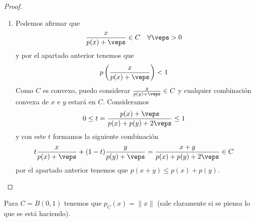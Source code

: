 \begin{propiedades}
\begin{proof}
\begin{enumerate}
            \item Podemos afirmar que 
            \begin{gather*}
                \frac{x}{p(x)+\veps} \in C \ \ \ \forall \veps > 0
            \end{gather*}
            y por el apartado anterior tenemos que 
            \begin{gather*}
                p\left(\frac{x}{p(x)+\veps}\right)<1
            \end{gather*}
            Como $C$ es convexo, puedo considerar $\frac{y}{p(y)+\veps}\in C$ y cualquier combinación convexa de $x$ e $y$ estará en $C$. Consideramos 
            \begin{gather*}
                0\leq t = \frac{p(x)+\veps}{p(x)+p(y)+2\veps} \leq 1
            \end{gather*}
            y con este $t$ formamos la siguiente combinación
            \begin{gather*}
                t \frac{x}{p(x)+\veps} + (1-t) \frac{y}{p(y)+\veps} = \frac{x + y}{p(x)+p(y)+2\veps} \in C
            \end{gather*}
            por el apartado anterior tenemos que $p(x+y)\leq p(x) + p(y)$.
        \end{enumerate}
    \end{proof}
\end{propiedades}

\begin{ejemplo}
    Para $C=B(0,1)$ tenemos que $p_C(x)=\|x\|$ (sale claramente si se piensa lo que se está haciendo).
\end{ejemplo}

